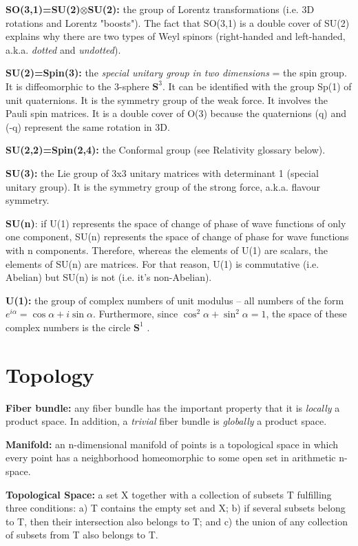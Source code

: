 \begin{list}{}{}
	\item \textbf{SO(3,1)=SU(2)$\otimes$SU(2):} the group of Lorentz transformations (i.e. 3D rotations and Lorentz "boosts"). The fact that SO(3,1) is a double cover of SU(2) explains why there are two types of  Weyl spinors (right-handed and left-handed, a.k.a. \emph{dotted} and \emph{undotted}).
	
	\item \textbf{SU(2)=Spin(3):} the \emph{special unitary group in two dimensions} = the spin group. It is diffeomorphic to the 3-sphere $\mathbf{S}^3$. It can be identified with the group Sp(1) of unit quaternions. It is the symmetry group of the weak force. It involves the Pauli spin matrices. It is a double cover of O(3) because the quaternions (q) and (-q) represent the same rotation in 3D.
	\item \textbf{SU(2,2)=Spin(2,4):} the Conformal group (see Relativity glossary below).
	\item \textbf{SU(3):} the Lie group of 3x3 unitary matrices with determinant 1 (special unitary group). It is the symmetry group of the strong force, a.k.a. flavour symmetry.
	\item \textbf{SU(n)}: if U(1) represents the space of change of phase of wave functions of only one component, SU(n) represents the space of change of phase for wave functions with n components. Therefore, whereas the elements of U(1) are scalars, the elements of SU(n) are matrices. For that reason, U(1) is commutative (i.e. Abelian) but SU(n) is not (i.e. it's non-Abelian).
	\item \textbf{U(1):} the group of complex numbers of unit modulus -- all numbers of the form $e^{i\alpha} = \cos\alpha + i\sin\alpha$. Furthermore, since $\cos^2 \alpha + \sin^2 \alpha = 1$, the space of these complex numbers is the circle $\mathbf{S}^1$ .
\end{list}{}{}
	

\section{Topology}

\begin{list}{}{}
	\item \textbf{Fiber bundle:} any fiber bundle has the important property that it is \emph{locally} a product space. In addition, a \emph{trivial} fiber bundle is \emph{globally} a product space.
	\item \textbf{Manifold:} an n-dimensional manifold of points is a topological space in which every point has a neighborhood homeomorphic to some open set in arithmetic n-space.
	\item \textbf{Topological Space:} a set X together with a collection of subsets T fulfilling three conditions: a) T contains the empty set and X; b) if several subsets belong to T, then their intersection also belongs to T; and c) the union of any collection of subsets from T also belongs to T.
\end{list}


